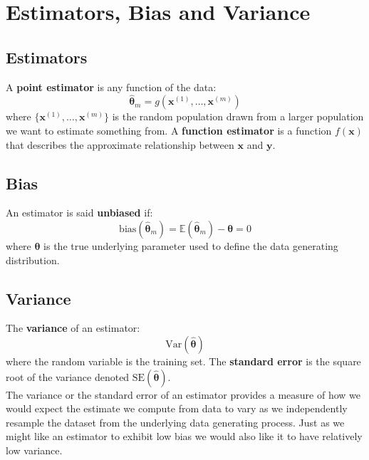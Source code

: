 \documentclass[12pt]{report}
\begin{document}
    \section{Estimators, Bias and Variance}
        \subsection{Estimators}
            A \textbf{point estimator} is any function of the data:
            \begin{equation}
                \hat{\boldsymbol{\theta}}_m = g(\boldsymbol{x}^{(1)}, \dots,\boldsymbol{x}^{(m)})
            \end{equation}
            where $\{\boldsymbol{x}^{(1)}, \dots,\boldsymbol{x}^{(m)}\}$ is the random population drawn from a larger population we want to estimate something from.
            A \textbf{function estimator} is a function $f(\boldsymbol{x})$ that describes the approximate relationship between $\boldsymbol{x}$ and $\boldsymbol{y}$.
        \subsection{Bias}
            An estimator is said \textbf{unbiased} if:
            \begin{equation}
                \text{bias}(\hat{\boldsymbol{\theta}}_m) = \mathbb{E}(\hat{\boldsymbol{\theta}}_m) - \boldsymbol{\theta} = 0
            \end{equation}
            where $\boldsymbol{\theta}$ is the true underlying parameter used to define the data generating distribution.
        \subsection{Variance}
            The \textbf{variance} of an estimator:
            \begin{equation}
                \text{Var}(\hat{\boldsymbol{\theta}})
            \end{equation} 
            where the random variable is the training set.
            The \textbf{standard error} is the square root of the variance denoted $\text{SE}(\hat{\boldsymbol{\theta}})$.\\
            
            The variance or the standard error of an estimator provides a measure of how we would expect the estimate we compute from data to vary as we independently resample the dataset from the underlying data generating process. Just as we might like an estimator to exhibit low bias we would also like it to have relatively low variance.
        
\end{document}
